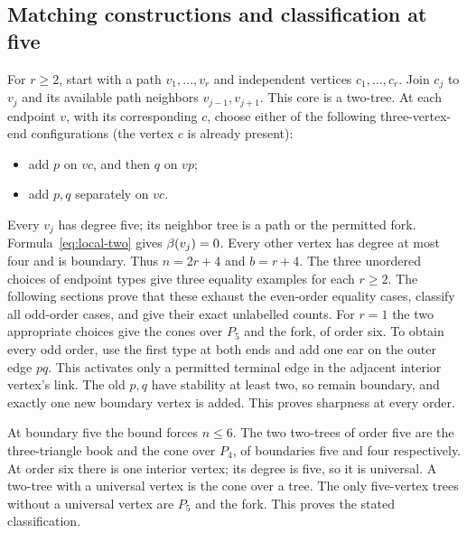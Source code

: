 \subsection{Matching constructions and classification at five}
For $r\ge2$, start with a path $v_1,\ldots,v_r$ and independent vertices
$c_1,\ldots,c_r$. Join $c_j$ to $v_j$ and its available path neighbors
$v_{j-1},v_{j+1}$. This core is a two-tree. At each endpoint $v$, with
its corresponding $c$, choose either of the following three-vertex-end
configurations (the vertex $c$ is already present):
\begin{itemize}
\item add $p$ on $vc$, and then $q$ on $vp$;
\item add $p,q$ separately on $vc$.
\end{itemize}
Every $v_j$ has degree five; its neighbor tree is a path or the permitted
fork. Formula~\eqref{eq:local-two} gives $\beta(v_j)=0$.
Every other vertex has degree at most four and is boundary. Thus
$n=2r+4$ and $b=r+4$. The three unordered choices of endpoint types
give three equality examples for each $r\ge2$. The following sections prove
that these exhaust the even-order equality cases, classify all odd-order
cases, and give their exact unlabelled counts.
For $r=1$ the two appropriate choices give the cones over $P_5$ and
the fork, of order six. To obtain every odd order, use the first type at
both ends and add one ear on the outer edge $pq$. This activates only
a permitted terminal edge in the adjacent interior vertex's link.
The old $p,q$ have stability at least two, so remain boundary, and exactly
one new boundary vertex is added. This proves sharpness at every order.

At boundary five the bound forces $n\le6$. The two two-trees of order
five are the three-triangle book and the cone over $P_4$, of boundaries
five and four respectively. At order six there is one interior vertex;
its degree is five, so it is universal. A two-tree with a universal vertex
is the cone over a tree. The only five-vertex trees without a universal
vertex are $P_5$ and the fork. This proves the stated classification.

